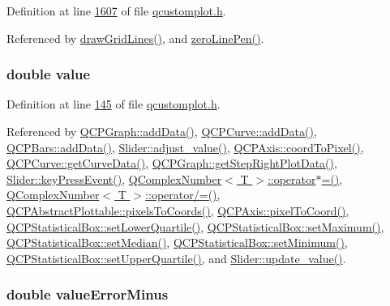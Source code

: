 Definition at line \hyperlink{a00116_source_l01607}{1607} of file \hyperlink{a00116_source}{qcustomplot.\+h}.



Referenced by \hyperlink{a00115_source_l14260}{draw\+Grid\+Lines()}, and \hyperlink{a00116_source_l01593}{zero\+Line\+Pen()}.

\hypertarget{a00116_aee90379adb0307effb138f4871edbc5c}{
\subsubsection[{value}]{\setlength{\rightskip}{0pt plus 5cm}double value}}\label{a00116_aee90379adb0307effb138f4871edbc5c}


Definition at line \hyperlink{a00116_source_l00145}{145} of file \hyperlink{a00116_source}{qcustomplot.\+h}.



Referenced by \hyperlink{a00115_source_l00713}{Q\+C\+P\+Graph\+::add\+Data()}, \hyperlink{a00115_source_l09367}{Q\+C\+P\+Curve\+::add\+Data()}, \hyperlink{a00115_source_l10049}{Q\+C\+P\+Bars\+::add\+Data()}, \hyperlink{a00133_source_l00069}{Slider\+::adjust\+\_\+value()}, \hyperlink{a00115_source_l04531}{Q\+C\+P\+Axis\+::coord\+To\+Pixel()}, \hyperlink{a00115_source_l09591}{Q\+C\+P\+Curve\+::get\+Curve\+Data()}, \hyperlink{a00115_source_l01167}{Q\+C\+P\+Graph\+::get\+Step\+Right\+Plot\+Data()}, \hyperlink{a00133_source_l00219}{Slider\+::key\+Press\+Event()}, \hyperlink{a00113_source_l00137}{Q\+Complex\+Number$<$ T $>$\+::operator$\ast$=()}, \hyperlink{a00113_source_l00129}{Q\+Complex\+Number$<$ T $>$\+::operator/=()}, \hyperlink{a00115_source_l08716}{Q\+C\+P\+Abstract\+Plottable\+::pixels\+To\+Coords()}, \hyperlink{a00115_source_l04493}{Q\+C\+P\+Axis\+::pixel\+To\+Coord()}, \hyperlink{a00115_source_l10463}{Q\+C\+P\+Statistical\+Box\+::set\+Lower\+Quartile()}, \hyperlink{a00115_source_l10498}{Q\+C\+P\+Statistical\+Box\+::set\+Maximum()}, \hyperlink{a00115_source_l10475}{Q\+C\+P\+Statistical\+Box\+::set\+Median()}, \hyperlink{a00115_source_l10451}{Q\+C\+P\+Statistical\+Box\+::set\+Minimum()}, \hyperlink{a00115_source_l10487}{Q\+C\+P\+Statistical\+Box\+::set\+Upper\+Quartile()}, and \hyperlink{a00133_source_l00088}{Slider\+::update\+\_\+value()}.

\hypertarget{a00116_aea31bce613e569fc5e1888465c677909}{
\subsubsection[{value\+Error\+Minus}]{\setlength{\rightskip}{0pt plus 5cm}double value\+Error\+Minus}}\label{a00116_aea31bce613e569fc5e1888465c677909}


